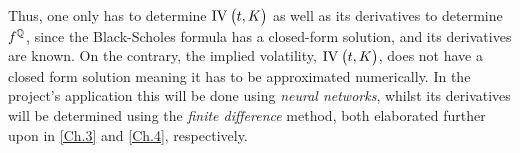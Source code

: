 Thus, one only has to determine $\IV{t,K}$ as well as its derivatives to determine $f^{\mathbb{Q}}$, since the Black-Scholes formula has a closed-form solution, and its derivatives are known. On the contrary, the implied volatility, $\IV{t,K}$, does not have a closed form solution meaning it has to be approximated numerically. In the project's application this will be done using \emph{neural networks}, whilst its derivatives will be determined using the \emph{finite difference} method, both elaborated further upon in \autoref{Ch.3} and \autoref{Ch.4}, respectively.

